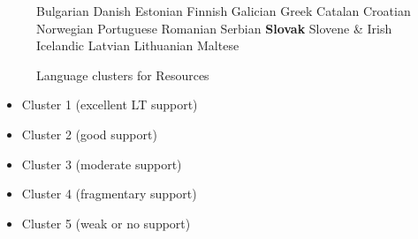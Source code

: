 \begin{multicols}{2}
\begin{figure}[htb]
\begin{tabular}
    Bulgarian\newline 
    Danish \newline 
    Estonian \newline 
    Finnish \newline 
    Galician \newline 
    Greek \newline 
    Catalan \newline 
    Croatian \newline 
    Norwegian \newline 
    Portuguese \newline 
    Romanian \newline 
    Serbian \newline 
    \textbf{Slovak} \newline 
    Slovene \newline
&  \vspace*{0.5mm} Irish \newline 
    Icelandic \newline 
    Latvian \newline 
    Lithuanian \newline 
    Maltese  \\
  \end{tabular}
  \caption{Language clusters for Resources}
  \label{fig:resources_cluster_en}
\end{figure}

  
\begin{itemize}
  \item Cluster 1 (excellent LT support)
  \item Cluster 2 (good support)
  \item Cluster 3 (moderate support)
  \item Cluster 4 (fragmentary support) 
  \item Cluster 5 (weak or no support)
\end{itemize}


\end{multicols}
